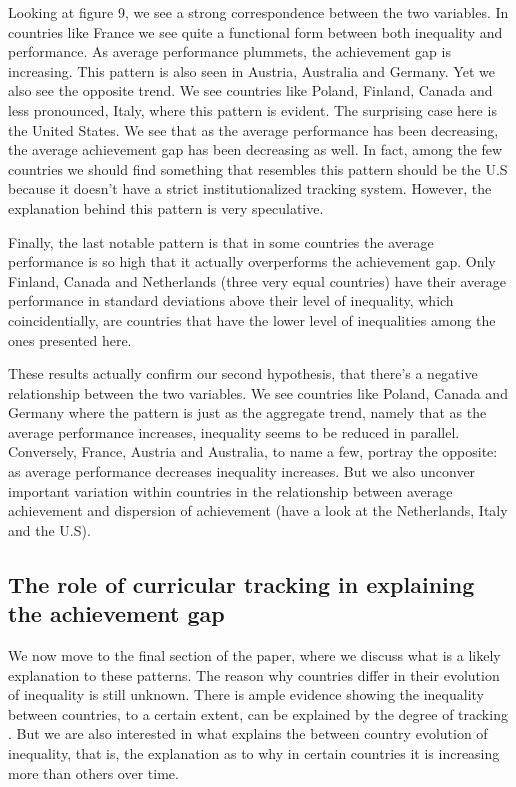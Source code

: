 \documentclass[11pt, a4paper]{article}\usepackage[]{graphicx}\usepackage[]{color}
\begin{document}
Looking at figure 9, we see a strong correspondence between the two variables. In countries like France we see quite a functional form between both inequality and performance. As average performance plummets, the achievement gap is increasing. This pattern is also seen in Austria, Australia and Germany. Yet we also see the opposite trend. We see countries like Poland, Finland, Canada and less pronounced, Italy, where this pattern is evident. The surprising case here is the United States. We see that as the average performance has been decreasing, the average achievement gap has been decreasing as well. In fact, among the few countries we should find something that resembles this pattern should be the U.S because it doesn't have a strict institutionalized tracking system. However, the explanation behind this pattern is very speculative.

Finally, the last notable pattern is that in some countries the average performance is so high that it actually overperforms the achievement gap. Only Finland, Canada and Netherlands (three very equal countries) have their average performance in standard deviations above their level of inequality, which coincidentially, are countries that have the lower level of inequalities among the ones presented here.

These results actually confirm our second hypothesis, that there's a negative relationship between the two variables. We see countries like Poland, Canada and Germany where the pattern is just as the aggregate trend, namely that as the average performance increases, inequality seems to be reduced in parallel. Conversely, France, Austria and Australia, to name a few, portray the opposite: as average performance decreases inequality increases. But we also unconver important variation within countries in the relationship between average achievement and dispersion of achievement (have a look at the Netherlands, Italy and the U.S).

\subsection{The role of curricular tracking in explaining the achievement gap}











We now move to the final section of the paper, where we discuss what is a likely explanation to these patterns. The reason why countries differ in their evolution of inequality is still unknown. There is ample evidence showing the inequality between countries, to a certain extent, can be explained by the degree of tracking \citep{hanushek_woesmann_tracking}. But we are also interested in what explains the between country evolution of inequality, that is, the explanation as to why in certain countries it is increasing more than others over time.
\end{document}
